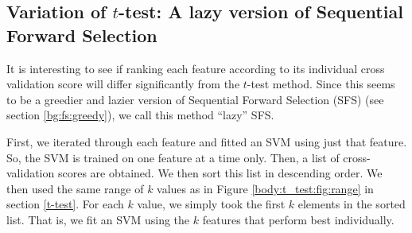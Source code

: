 \documentclass[12pt, twoside, a4paper]{report}
\begin{document}




\subsection{Variation of $t$-test: A lazy version of Sequential Forward Selection} \label{body:sfs:lazy}

It is interesting to see if ranking each feature according to its individual cross validation score will differ significantly from the $t$-test method. Since this seems to be a greedier and lazier version of Sequential Forward Selection (SFS) (see section \ref{bg:fs:greedy}), we call this method ``lazy'' SFS.

First, we iterated through each feature and fitted an SVM using just that feature. So, the SVM is trained on one feature at a time only. Then, a list of cross-validation scores are obtained. We then sort this list in descending order. We then used the same range of $k$ values as in Figure \ref{body:t_test:fig:range} in section \ref{t-test}. For each $k$ value, we simply took the first $k$ elements in the sorted list. That is, we fit an SVM using the $k$ features that perform best individually.
\end{document}
